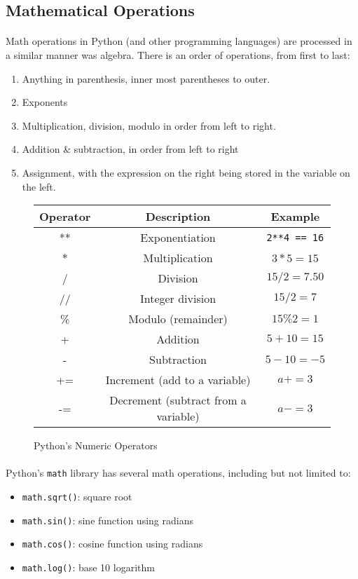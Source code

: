 \documentclass[letter,10pt]{article}
\begin{document}
\FloatBarrier
\subsection{Mathematical Operations}
\paragraph{}Math operations in Python (and other programming languages) are processed in a similar manner was algebra. There is an order of operations, from first to last:

\begin{enumerate}
    \item Anything in parenthesis, inner most parentheses to outer.
    \item Exponents
    \item Multiplication, division, modulo in order from left to right.
    \item Addition \& subtraction, in order from left to right
    \item Assignment, with the expression on the right being stored in the variable on the left.
\end{enumerate}

\begin{figure}[htbp]
\centering
\begin{tabular}{ c c c }
 Operator & Description & Example \\
 \hline 
 **    & Exponentiation & \verb|2**4 == 16| \\
 $*$ & Multiplication & $3 * 5 = 15$ \\  
 /     & Division & $15 / 2 = 7.50$ \\
 //    & Integer division & $15 / 2 = 7$ \\
 \%  & Modulo (remainder) & $15 \% 2 = 1$ \\
 +    & Addition & $5 + 10 = 15$ \\
 -    & Subtraction & $5 - 10 = -5$ \\
 += & Increment (add to a variable) & $a += 3$ \\
 -=  & Decrement (subtract from a variable) & $a -= 3$
\end{tabular}
\caption{Python's Numeric Operators}
\end{figure}

\FloatBarrier
\paragraph{}Python's \verb|math| library has several math operations, including but not limited to:
\begin{itemize}
    \item \verb|math.sqrt()|: square root
    \item \verb|math.sin()|: sine function using radians
    \item \verb|math.cos()|: cosine function using radians
    \item \verb|math.log()|: base 10 logarithm
\end{itemize}
\end{document}
